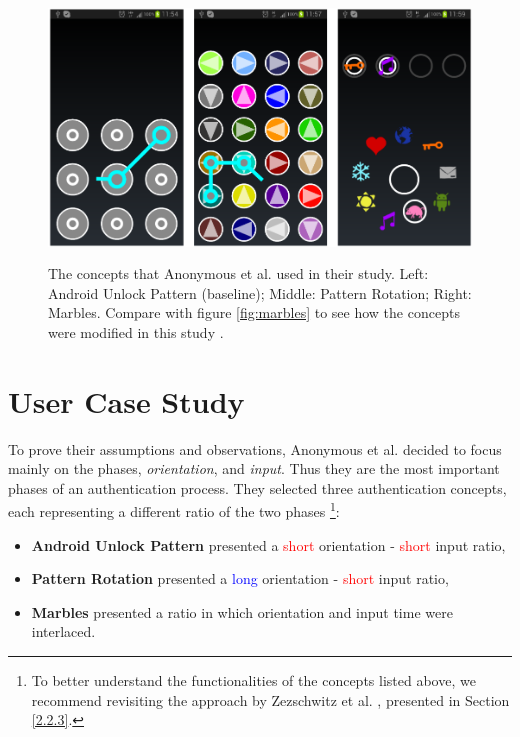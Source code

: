 \begin{figure}[t!]
\centering
\includegraphics[width=14cm, height=7cm]{Chapters/graphics/androidPatternMarble.PNG}
\caption{The concepts that Anonymous et al. \cite{anonymous} used in their study. Left: Android Unlock Pattern (baseline); Middle: Pattern Rotation; Right: Marbles. Compare with figure \ref{fig:marbles} to see how the concepts were modified in this study \cite{anonymous}.}
\label{fig:android}
\end{figure}

\section{User Case Study}

To prove their assumptions and observations, Anonymous et al. \cite{anonymous} decided to focus mainly on the phases, \textit{orientation}, and \textit{input}. Thus they are the most important phases of an authentication process. They selected three authentication concepts, each representing a different ratio of the two phases \cite{anonymous}
\footnote{To better understand the functionalities of the concepts listed above, we recommend revisiting the approach by Zezschwitz et al. \cite{Marbles}, presented in Section \ref{2.2.3}.}: 

\begin{itemize}
    \item \textbf{Android Unlock Pattern} presented a \textcolor{red}{short} orientation - \textcolor{red}{short} input ratio,
    \item \textbf{Pattern Rotation} presented a \textcolor{blue}{long} orientation - \textcolor{red}{short} input ratio,
    \item \textbf{Marbles} presented a ratio in which orientation and input time were interlaced.
\end{itemize}

